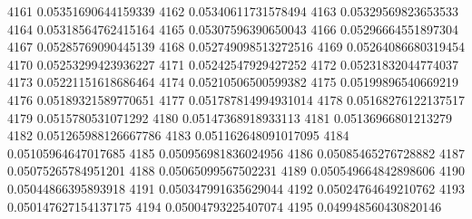 4161 0.05351690644159339
4162 0.05340611731578494
4163 0.05329569823653533
4164 0.05318564762415164
4165 0.05307596390650043
4166 0.05296664551897304
4167 0.05285769090445139
4168 0.052749098513272516
4169 0.05264086680319454
4170 0.05253299423936227
4171 0.05242547929427252
4172 0.05231832044774037
4173 0.05221151618686464
4174 0.05210506500599382
4175 0.05199896540669219
4176 0.05189321589770651
4177 0.051787814994931014
4178 0.05168276122137517
4179 0.0515780531071292
4180 0.05147368918933113
4181 0.05136966801213279
4182 0.051265988126667786
4183 0.051162648091017095
4184 0.05105964647017685
4185 0.050956981836024956
4186 0.05085465276728882
4187 0.05075265784951201
4188 0.05065099567502231
4189 0.050549664842898606
4190 0.05044866395893918
4191 0.050347991635629044
4192 0.05024764649210762
4193 0.050147627154137175
4194 0.05004793225407074
4195 0.049948560430820146
